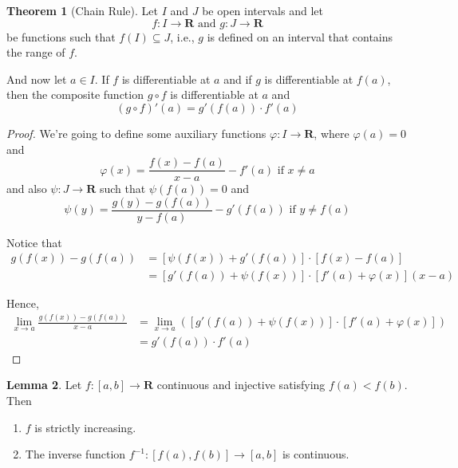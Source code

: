 \documentclass[tikz,12pt,a4paper]{article}
\theoremstyle{definition}
\newtheorem{theorem}{Theorem}[section]
\newtheorem{lemma}[theorem]{Lemma}
\begin{document}
\begin{theorem}[Chain Rule]
	Let $I$ and $J$ be open intervals and let
	\[
		f : I \longrightarrow \textbf{R} \text{ and } g : J \longrightarrow \textbf{R}
	\]
	be functions such that $f(I) \subseteq J$, i.e., $g$ is defined on an interval that contains the range of $f$. 

	And now let $a \in I$. If $f$ is differentiable at $a$ and if $g$ is differentiable at $f(a)$, then the composite function $g \circ f$ is differentiable at $a$ and
	\[
		(g \circ f)'(a) = g'(f(a)) \cdot f'(a)
	\]
\end{theorem}

\begin{proof}
	We're going to define some auxiliary functions $\varphi : I \longrightarrow \textbf{R}
$, where $\varphi(a) = 0$ and
\[
	\varphi(x) = \frac{f(x) - f(a)}{x - a} - f'(a) \text{ if } x \neq a
\]
and also $\psi : J \longrightarrow \textbf{R}$ such that $\psi(f(a)) = 0$ and
\[
	\psi(y) = \frac{g(y) - g(f(a))}{y - f(a)} - g'(f(a)) \text { if } y \neq f(a)
\]

Notice that 
\begin{equation*}
	\begin{aligned}
		g(f(x)) - g(f(a)) &= [\psi(f(x)) + g'(f(a))] \cdot [f(x) - f(a)] \\
		&= [g'(f(a)) + \psi(f(x))] \cdot [f'(a) + \varphi(x)](x-a)
	\end{aligned}
\end{equation*}

Hence,
\begin{equation*}
	\begin{aligned}
	\lim_{x \to a} \frac{g(f(x)) - g(f(a))}{x - a} &= \lim_{x \to a} ([g'(f(a)) + \psi(f(x))] \cdot [f'(a) + \varphi(x)]) \\
	&= g'(f(a)) \cdot f'(a)
	\end{aligned}
\end{equation*}

\end{proof}

\begin{lemma}
	Let $f : [a,b] \longrightarrow \textbf{R}$ continuous and injective satisfying $f(a) < f(b)$. Then
	\begin{enumerate}
		\item $f$ is strictly increasing.
		\item The inverse function $f^{-1} : [f(a), f(b)] \longrightarrow [a,b]$ is continuous.
	\end{enumerate}
\end{lemma}
\end{document}
